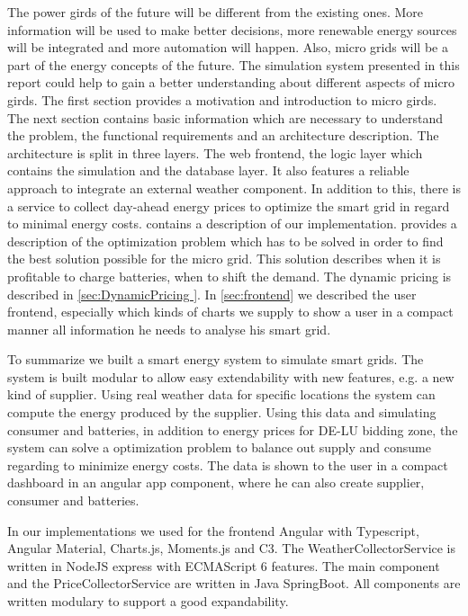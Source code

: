 The power girds of the future will be different from the existing ones. More information will be used to make better decisions, more renewable energy sources will be integrated and more automation will happen.
Also, micro grids will be a part of the energy concepts of the future.
The simulation system presented in this report could help to gain a better understanding about different aspects of micro girds. 
The first section provides a motivation and introduction to micro girds. 
The next section contains basic information which are necessary to understand the problem, the functional requirements and an architecture description.
The architecture is split in three layers. 
The web frontend, the logic layer which contains the simulation and the database layer.
It also features a reliable approach to integrate an external weather component.
In addition to this, there is a service to collect day-ahead energy prices to optimize the smart grid in regard to minimal energy costs. 
 contains a description of our implementation.
 provides a description of the optimization problem which has to be solved in order to find the best solution possible for the micro grid. 
This solution describes when it is profitable to charge batteries, when to shift the demand.
The dynamic pricing is described in \cref{sec:DynamicPricing }.
In \cref{sec:frontend} we described the user frontend, especially which kinds of charts we supply to show a user in a compact manner all information he needs to analyse his smart grid.

To summarize we built a smart energy system to simulate smart grids.
The system is built modular to allow easy extendability with new features, e.g. a new kind of supplier.
Using real weather data for specific locations the system can compute the energy produced by the supplier.
Using this data and simulating consumer and batteries, in addition to energy prices for DE-LU bidding zone, the system can solve a optimization problem to balance out supply and consume regarding to minimize energy costs.
The data is shown to the user in a compact dashboard in an angular app component, where he can also create supplier, consumer and batteries.

In our implementations we used for the frontend Angular with Typescript, Angular Material, Charts.js, Moments.js and C3.
The WeatherCollectorService is written in NodeJS express with ECMAScript 6 features.
The main component and the PriceCollectorService are written in Java SpringBoot.
All components are written modulary to support a good expandability. 

